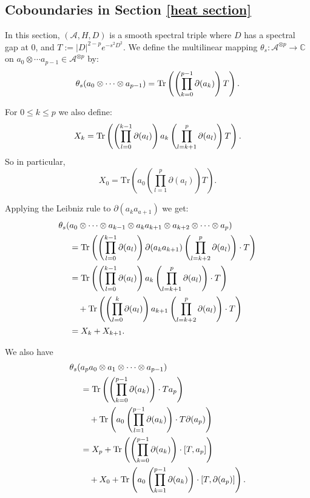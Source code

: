 \subsection{Coboundaries in Section \ref{heat section}}
    In this section, $(\mathcal{A},H,D)$ is a smooth spectral triple where $D$ has a spectral gap at $0$, and $T := |D|^{2-p}e^{-s^2D^2}$.
    We define the multilinear mapping $\theta_s:\mathcal{A}^{\otimes p}\to\mathbb{C}$ on $a_0\otimes\cdots a_{p-1} \in \mathcal{A}^{\otimes p}$ by:
    \begin{equation*}
        \theta_s(a_0\otimes\cdots\otimes a_{p-1}) = {\rm Tr}\left(\left(\prod_{k=0}^{p-1}\partial(a_k)\right) T\right).
    \end{equation*}

    For $0 \leq k \leq p$ we also define:
    \begin{equation*}
        X_k = {\rm Tr}\left(\left(\prod_{l=0}^{k-1}\partial(a_l)\right)a_k\left(\prod_{l=k+1}^p\partial(a_l)\right)T\right).
    \end{equation*}
    So in particular,
    \begin{equation*}
        X_0 = \mathrm{Tr}\left(a_0\left(\prod_{l=1}^{p}\partial(a_l)\right)T\right).
    \end{equation*}
    
    

    Applying the Leibniz rule to $\partial(a_ka_{a+1})$ we get:
    \begin{align*}
        \theta_s(&a_0\otimes\cdots\otimes a_{k-1}\otimes a_ka_{k+1}\otimes a_{k+2}\otimes\cdots\otimes a_p)\\
                 &= {\rm Tr}\left(\left(\prod_{l=0}^{k-1}\partial(a_l)\right)\partial(a_ka_{k+1})\left(\prod_{l=k+2}^p\partial(a_l)\right)\cdot T\right)\\
                 &= {\rm Tr}\left(\left(\prod_{l=0}^{k-1}\partial(a_l)\right) a_k\left(\prod_{l=k+1}^p\partial(a_l)\right)\cdot T\right)\\
                 &\quad +{\rm Tr}\left(\left(\prod_{l=0}^k\partial(a_l)\right) a_{k+1}\left(\prod_{l=k+2}^p\partial(a_l)\right)\cdot T\right)\\
                 &=X_k+X_{k+1}.
    \end{align*}

    We also have
    \begin{align*}
        \theta_s(&a_pa_0\otimes a_1\otimes\cdots\otimes a_{p-1})\\
                 &= {\rm Tr}\left(\left(\prod_{k=0}^{p-1}\partial(a_k)\right)\cdot Ta_p\right)\\
                 &\quad + {\rm Tr}\left(a_0\left(\prod_{l=1}^{p-1}\partial(a_k)\right)\cdot T\partial(a_p)\right)\\
                 &= X_p + {\rm Tr}\left(\left(\prod_{k=0}^{p-1}\partial(a_k)\right)\cdot [T,a_p]\right)\\
                 &\quad + X_0+{\rm Tr}\left(a_0\left(\prod_{k=1}^{p-1}\partial(a_k)\right)\cdot [T,\partial(a_p)]\right).
    \end{align*}


